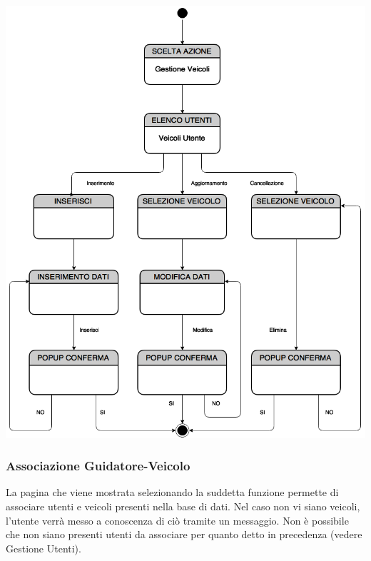 \documentclass[a4paper,12pt]{beamer}
\begin{document}
\begin{frame}

\begin{center}
\includegraphics[scale=0.4]{../UseCase/Veicoli.png}
\end{center}
\end{frame}

\begin{frame}
\frametitle{Associazione Guidatore-Veicolo}
La pagina che viene mostrata selezionando la suddetta funzione permette di associare utenti e veicoli presenti nella base di dati. Nel caso non vi siano veicoli, l'utente verrà messo a conoscenza di ciò tramite un messaggio. Non è possibile che non siano presenti utenti da associare per quanto detto in precedenza (vedere Gestione Utenti).
\end{frame}
\end{document}
